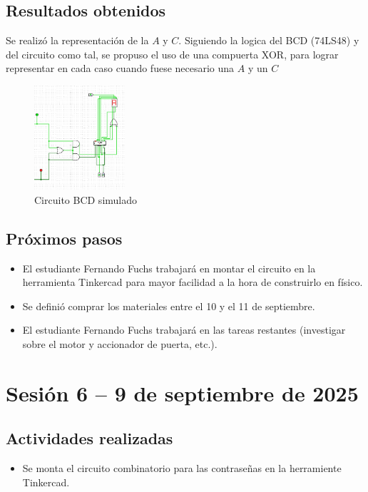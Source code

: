 \documentclass[12pt,letterpaper]{article}
\begin{document}
\subsection*{Resultados obtenidos}
Se realizó la representación de la $A$ y $C$. Siguiendo la logica del BCD (74LS48) y del circuito como tal, se propuso el uso de una compuerta XOR, para lograr representar en cada caso cuando fuese necesario una $A$ y un $C$
\begin{figure}[H]
    \centering
    \includegraphics[width=0.3\textwidth]{images/bcd_mod.png} %
    \caption{Circuito BCD simulado}
    \label{fig:sensores}
\end{figure}

\subsection*{Próximos pasos}
\begin{itemize}
    \item El estudiante Fernando Fuchs trabajará en montar el circuito en la herramienta Tinkercad para mayor facilidad a la hora de construirlo en físico.
    \item Se definió comprar los materiales entre el 10 y el 11 de septiembre.
    \item El estudiante Fernando Fuchs trabajará en las tareas restantes (investigar sobre el motor y accionador de puerta, etc.).
\end{itemize}


\section{Sesión 6 -- 9 de septiembre de 2025}
\subsection*{Actividades realizadas}
\begin{itemize}
    \item Se monta el circuito combinatorio para las contraseñas en la herramiente Tinkercad.
\end{itemize}
\end{document}
